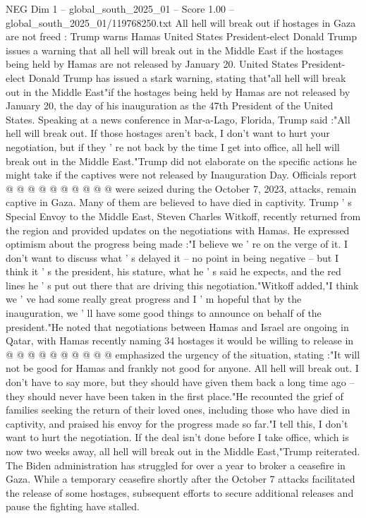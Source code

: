 \begin{textsample}{NEG Dim 1 – global\_south\_2025\_01 – Score 1.00 – global\_south\_2025\_01/119768250.txt}  \label{ex:f1_neg_149}
All hell will break out if hostages in Gaza are not freed : Trump warns Hamas United States President-elect Donald Trump issues a warning that all hell will break out in the Middle East if the hostages being held by Hamas are not released by January 20.
United States President-elect Donald Trump has issued a stark warning, stating that"all hell will break out in the Middle East"if the hostages being held by Hamas are not released by January 20, the day of his inauguration as the 47th President of the United States.
Speaking at a news conference in Mar-a-Lago, Florida, Trump said :"All hell will break out.
If those hostages aren't back, I don't want to hurt your negotiation, but if they ' re not back by the time I get into office, all hell will break out in the Middle East."Trump did not elaborate on the specific actions he might take if the captives were not released by Inauguration Day.
Officials report @ @ @ @ @ @ @ @ @ @ were seized during the October 7, 2023, attacks, remain captive in Gaza.
Many of them are believed to have died in captivity.
Trump ' s Special Envoy to the Middle East, Steven Charles Witkoff, recently returned from the region and provided updates on the negotiations with Hamas.
He expressed optimism about the progress being made :"I believe we ' re on the verge of it.
I don't want to discuss what ' s delayed it -- no point in being negative -- but I think it ' s the president, his stature, what he ' s said he expects, and the red lines he ' s put out there that are driving this negotiation."Witkoff added,"I think we ' ve had some really great progress and I ' m hopeful that by the inauguration, we ' ll have some good things to announce on behalf of the president."He noted that negotiations between Hamas and Israel are ongoing in Qatar, with Hamas recently naming 34 hostages it would be willing to release in @ @ @ @ @ @ @ @ @ @ emphasized the urgency of the situation, stating :"It will not be good for Hamas and frankly not good for anyone.
All hell will break out.
I don't have to say more, but they should have given them back a long time ago -- they should never have been taken in the first place."He recounted the grief of families seeking the return of their loved ones, including those who have died in captivity, and praised his envoy for the progress made so far."I tell this, I don't want to hurt the negotiation.
If the deal isn't done before I take office, which is now two weeks away, all hell will break out in the Middle East,"Trump reiterated.
The Biden administration has struggled for over a year to broker a ceasefire in Gaza.
While a temporary ceasefire shortly after the October 7 attacks facilitated the release of some hostages, subsequent efforts to secure additional releases and pause the fighting have stalled.

\end{textsample}
